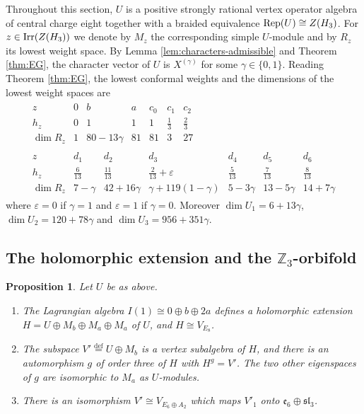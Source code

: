 \documentclass[leqno]{article}
\let\cal\relax
\newcommand{\cal}{\mathcal}
\newcommand{\Z}{\ensuremath{\mathbb{Z}}}
\newcommand{\ov}{\overset}
\newcommand{\epsi}{\varepsilon}
\DeclareMathOperator{\Irr}{Irr}
\DeclareMathOperator{\Rep}{Rep}
\newtheorem{prop}[thm]{Proposition}
\numberwithin{equation}{section}
\begin{document}
Throughout this section, $U$ is a positive strongly rational vertex operator algebra of central charge eight together with a braided equivalence $\Rep(U) \cong Z(\cal H_3)$. For $z \in \Irr(Z(\cal H_3))$ we denote by $M_z$ the corresponding simple $U$-module and by $R_z$ its lowest weight space. By Lemma \ref{lem:characters-admissible} and Theorem \ref{thm:EG}, the character vector of $U$ is $X^{(\gamma)}$ for some $\gamma \in \{0,1\}$. Reading Theorem \ref{thm:EG}, the lowest conformal weights and the dimensions of the lowest weight spaces are
\begin{equation}
\label{eq:lowest-spaces}
\begin{array}{c}
\begin{array}{c|cccccc}
z & 0 & b & a & c_0 & c_1 & c_2\\
\hline
h_z & 0 & 1 & 1 & 1 & \frac13 & \frac23\\
\dim R_z & 1 & 80-13\gamma & 81 & 81 & 3 & 27
\end{array}
\\[3mm]
\begin{array}{c|cccccc}
z & d_1 & d_2 & d_3 & d_4 & d_5 & d_6\\
\hline
h_z & \frac{6}{13} & \frac{11}{13} & \frac{2}{13}+\epsi & \frac{5}{13} & \frac{7}{13} & \frac{8}{13}\\
\dim R_z & 7-\gamma & 42+16\gamma & \gamma+119(1-\gamma) & 5-3\gamma & 13-5\gamma & 14+7\gamma
\end{array}
\end{array}
\end{equation}
where $\epsi = 0$ if $\gamma = 1$ and $\epsi = 1$ if $\gamma = 0$. Moreover $\dim U_1 = 6+13\gamma$, $\dim U_2 = 120+78\gamma$ and $\dim U_3 = 956+351\gamma$.

\subsection{The holomorphic extension and the \texorpdfstring{$\Z_3$}{Z3}-orbifold}

\begin{prop}
\label{prop:chain}
Let $U$ be as above.
\begin{enumerate}
\item The Lagrangian algebra $I(1) \cong 0 \oplus b \oplus 2a$ defines a holomorphic extension $H = U \oplus M_b \oplus M_a \oplus M_a$ of $U$, and $H \cong V_{E_8}$.
\item The subspace $V' \ov{\mathrm{def}}{=} U \oplus M_b$ is a vertex subalgebra of $H$, and there is an automorphism $g$ of order three of $H$ with $H^g = V'$. The two other eigenspaces of $g$ are isomorphic to $M_a$ as $U$-modules.
\item There is an isomorphism $V' \cong V_{E_6 \oplus A_2}$ which maps $V'_1$ onto $\mathfrak e_6 \oplus \mathfrak{sl}_3$.
\end{enumerate}
\end{prop}
\end{document}
